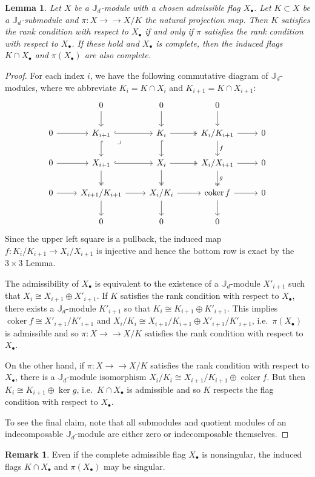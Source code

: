\documentclass{amsart}
\numberwithin{equation}{section}
\newtheorem{lemma}[theorem]{Lemma}
\theoremstyle{definition}
\newtheorem{remark}[theorem]{Remark}
\def\JJ{\mathbb{J}}
\def\coker{\operatorname{coker}}
\newcommand{\onto}{\to\!\!\!\!\!\to}
\begin{document}
\begin{lemma}\label{le:induced flags}
  Let $X$ be a $\JJ_d$-module with a chosen admissible flag $X_\bullet$.  Let $K\subset X$ be a $\JJ_d$-submodule and $\pi:X\onto X/K$ the natural projection map.  Then $K$ satisfies the rank condition with respect to $X_\bullet$ if and only if $\pi$ satisfies the rank condition with respect to $X_\bullet$.  If these hold and $X_\bullet$ is complete, then the induced flags $K\cap X_\bullet$ and $\pi(X_\bullet)$ are also complete.
\end{lemma}
\begin{proof}
  For each index $i$, we have the following commutative diagram of $\JJ_d$-modules, where we abbreviate $K_i=K\cap X_i$ and $K_{i+1}=K\cap X_{i+1}$:
\[\begin{tikzcd}
       & 0\arrow{d} &0\arrow{d}  & 0\arrow{d} &\ \\
      0\arrow{r} & K_{i+1}\arrow[hook]{r}\arrow[hook]{d}\arrow[dr, phantom, "\lrcorner", very near start] & K_i\arrow[two heads]{r}\arrow[hook]{d} & K_i/K_{i+1}\arrow{r}\arrow["f"]{d} & 0 \\
      0\arrow{r} & X_{i+1}\arrow[hook]{r}\arrow[two heads]{d} & X_i\arrow[two heads]{r}\arrow[two heads]{d} & X_i/X_{i+1}\arrow{r}\arrow[two heads, "g"]{d} & 0\\
      0\arrow{r}& X_{i+1}/K_{i+1}\arrow{r}\arrow{d} & X_i/K_i\arrow{r}\arrow{d}& \coker f\arrow{r}\arrow{d}& 0\\
       & 0 & 0 & 0 & 
    \end{tikzcd}\]
  Since the upper left square is a pullback, the induced map $f:K_i/K_{i+1}\to X_i/X_{i+1}$ is injective and hence the bottom row is exact by the $3\times 3$ Lemma.  

  The admissibility of $X_\bullet$ is equivalent to the existence of a $\JJ_d$-module $X'_{i+1}$ such that $X_i\cong X_{i+1}\oplus X'_{i+1}$.  If $K$ satisfies the rank condition with respect to $X_\bullet$, there exists a $\JJ_d$-module $K'_{i+1}$ so that $K_i\cong K_{i+1}\oplus K'_{i+1}$.  This implies $\coker f\cong X'_{i+1}/K'_{i+1}$ and $X_i/K_i\cong X_{i+1}/K_{i+1}\oplus X'_{i+1}/K'_{i+1}$, i.e.\ $\pi(X_\bullet)$ is admissible and so $\pi:X\onto X/K$ satisfies the rank condition with respect to $X_\bullet$.  

  On the other hand, if $\pi:X\onto X/K$ satisfies the rank condition with respect to $X_\bullet$, there is a $\JJ_d$-module isomorphism $X_i/K_i\cong X_{i+1}/K_{i+1}\oplus\coker f$.  But then $K_i\cong K_{i+1}\oplus\ker g$, i.e.\ $K\cap X_\bullet$ is admissible and so $K$ respects the flag condition with respect to $X_\bullet$.

  To see the final claim, note that all submodules and quotient modules of an indecomposable $\JJ_d$-module are either zero or indecomposable themselves.
\end{proof}
\begin{remark}
  Even if the complete admissible flag $X_\bullet$ is nonsingular, the induced flags $K\cap X_\bullet$ and $\pi(X_\bullet)$ may be singular.
\end{remark}
\end{document}
